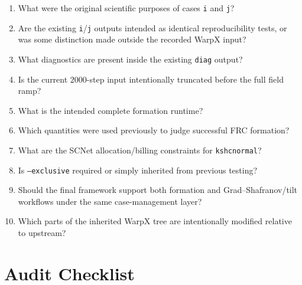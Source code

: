 \documentclass[11pt,a4paper]{article}
\begin{document}
\begin{enumerate}[label=\arabic*.]
    \item What were the original scientific purposes of cases \texttt{i} and \texttt{j}?
    \item Are the existing \texttt{i}/\texttt{j} outputs intended as identical reproducibility tests, or was some distinction made outside the recorded WarpX input?
    \item What diagnostics are present inside the existing \texttt{diag} output?
    \item Is the current \(2000\)-step input intentionally truncated before the full field ramp?
    \item What is the intended complete formation runtime?
    \item Which quantities were used previously to judge successful FRC formation?
    \item What are the SCNet allocation/billing constraints for \texttt{kshcnormal}?
    \item Is \texttt{--exclusive} required or simply inherited from previous testing?
    \item Should the final framework support both formation and Grad--Shafranov/tilt workflows under the same case-management layer?
    \item Which parts of the inherited WarpX tree are intentionally modified relative to upstream?
\end{enumerate}

\section{Audit Checklist}
\end{document}
